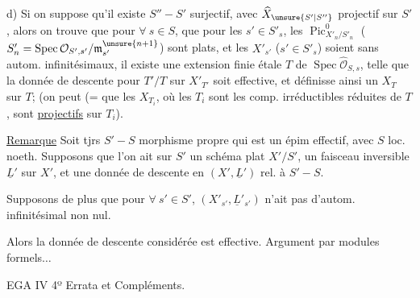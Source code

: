 
d) Si on suppose  qu'il existe $S''\mathbin{-}S'$   surjectif, avec $\widehat X_{\unsure{S'|S''}}$  projectif sur $S'$, alors on trouve que pour $\forall\ s\in S$,  que pour les $s'\in S'_s$, les $\operatorname{Pic}^0_{X'_n/S'_n}$ ($S'_n=\operatorname{Spec}\mathcal O_{S',s'}/\mathfrak m_{s'}^{\unsure{n+1}}$) sont plats, et  les $X'_{s'}$ ($s'\in S'_s$) soient sans autom. infinitésimaux, il existe une extension finie étale $T$ de $\operatorname{Spec}\widehat{\mathcal O}_{S,s}$, telle que la donnée de descente pour $T'/T$ sur $X'_{T'}$ soit effective, et définisse ainsi un $X_T$ sur $T$; (on peut (=  que les  $X_{T_i}$, où les $T_i$ sont les comp. irréductibles réduites de $T$, sont \uline{projectifs} sur $T_i$).

\uline{Remarque} Soit tjrs $S'\mathbin{-}S$ morphisme propre qui est un épim effectif, avec $S$ loc. noeth. Supposons que l'on ait sur $S'$ un schéma  plat $X'/S'$, un faisceau inversible $\underline L'$ sur $X'$, et une donnée de descente en $(X',\underline L')$ rel. à $S'\mathbin{-}S$.

 Supposons de plus que pour $\forall\ s'\in S'$, $(X'_{s'},\underline L'_{s'})$ n'ait pas d'autom. infinitésimal non nul.

Alors la donnée de descente considérée est effective. Argument par modules formels$\ldots$


EGA IV 4º Errata et Compléments.



